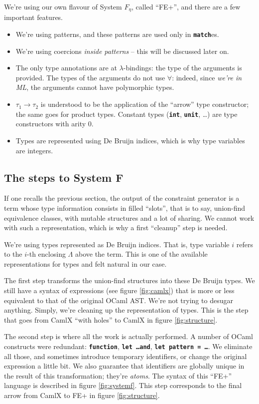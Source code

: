 \documentclass[10pt,a4paper,twoside,titlepage,twocolumn]{article}
\newcommand{\code}[1]{\textbf{\texttt{#1}}}
\begin{document}
We're using our own flavour of System $F_\eta$, called ``FE+'', and
there are a few important features.
\begin{itemize}
  \item We're using patterns, and these patterns are used only in
    \code{match}es.
  \item We're using coercions \emph{inside patterns} -- this will be discussed
    later on.
  \item The only type annotations are at $\lambda$-bindings: the type of the
    arguments is provided. The types of the arguments do not use $\forall$:
    indeed, since \emph{we're in ML}, the arguments cannot have polymorphic
    types.
  \item $\tau_1 \to \tau_2$ is understood to be the application of the ``arrow''
    type constructor; the same goes for product types. Constant types
    (\code{int}, \code{unit}, …) are type constructors with arity 0.
  \item Types are represented using De Bruijn indices, which is why type
    variables are integers.
\end{itemize}

\subsection{The steps to System F}

If one recalls the previous section, the output of the constraint generator is a
term whose type information consists in filled ``slots'', that is to say,
union-find equivalence classes, with mutable structures and a lot of sharing. We
cannot work with such a representation, which is why a first ``cleanup'' step is
needed.

We're using types represented as De Bruijn indices. That is, type variable
$i$ refers to the $i$-th enclosing $\Lambda$ above the term. This is one of the
available representations for types and felt natural in our case.

The first step transforms the union-find structures into these De Bruijn types.
We still have a syntax of expressions (see figure \vref{fig:camlx}) that is
more or less equivalent to that of the original OCaml AST. We're not trying to
desugar anything. Simply, we're cleaning up the representation of types. This
is the step that goes from CamlX ``with holes'' to CamlX in figure
\ref{fig:structure}.

The second step is where all the work is actually performed. A number of OCaml
constructs were redundant: \code{function}, \code{let \dots\;and}, \code{let
pattern = \dots}. We eliminate all those, and sometimes introduce temporary
identifiers, or change the original expression a little bit. We also guarantee
that identifiers are globally unique in the result of this transformation;
they're \emph{atoms}. The syntax of this ``FE+'' language is described in
figure \vref{fig:systemf}. This step corresponds to the final arrow from CamlX
to FE+ in figure \ref{fig:structure}.
\end{document}
